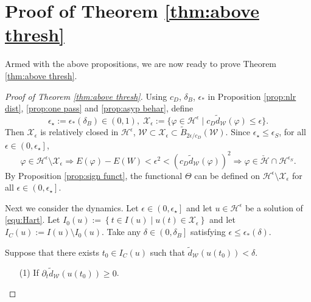 \documentclass[reqno, 11pt]{amsart}
\numberwithin{equation}{section}
\theoremstyle{plain}
\theoremstyle{definition}
\numberwithin{equation}{section}
\numberwithin{theorem}{section}
\numberwithin{equation}{section}
\numberwithin{equation}{section}
\numberwithin{theorem}{section}
\begin{document}
	\section{Proof of Theorem \ref{thm:above thresh}}\label{sect:pf main thm}
	Armed with the above propositions, we are now ready to prove Theorem \ref{thm:above thresh}.
	\begin{proof}[Proof of Theorem \ref{thm:above thresh}]
		Using $c_D$, $\delta_{B}$, $\epsilon_{*}$ in Proposition \ref{prop:nlr dist}, \ref{prop:one pass} and \ref{prop:asyp behar}, define 
		\begin{equation*}
		\epsilon_\star:=\epsilon_{*}(\delta_{B})\in(0,1),\; \mathcal{X}_{\epsilon}:=\{\varphi\in \mathcal{H}^{\epsilon}\;|\;c_D\widetilde{d}_{\mathcal{W}}(\varphi)\leq\epsilon  \}.
		\end{equation*}
		Then $\mathcal{X}_{\epsilon}$ is relatively closed in $\mathcal{H}^{\epsilon}$, $\mathcal{W} \subset \mathcal{X}_\epsilon \subset \widetilde{B}_{2\epsilon/ c_D}(\mathcal{W})$. Since $\epsilon_\star \leq \epsilon_{S}$, for all $\epsilon\in \left(0,\epsilon_\star  \right]$,
		\begin{equation*}
		\varphi\in \mathcal{H}^{\epsilon}\setminus \mathcal{X}_{\epsilon} \Longrightarrow E(\varphi)-E(W)<\epsilon^2<\left(c_D \widetilde{d}_{\mathcal{W}}(\varphi) \right)^2\Longrightarrow\varphi \in \check{\mathcal{H}}\cap \mathcal{H}^{\epsilon_{S}}.
		\end{equation*}		
		By Proposition \ref{prop:sign funct}, the functional $\Theta$ can be defined on $\mathcal{H}^{\epsilon}\setminus \mathcal{X}_{\epsilon}$ for all $\epsilon\in \left(0,\epsilon_\star  \right]$.
		
		Next we consider the dynamics. Let $\epsilon\in \left(0,\epsilon_\star  \right]$ and let $u\in \mathcal{H}^{\epsilon}$ be a solution of \eqref{equ:Hart}. Let $I_0(u):=\left\{t\in I(u)\; |\;  u(t)\in\mathcal{X}_\epsilon \right\}$ and let $I_C(u):=I(u)\setminus I_0(u)$. Take any $\delta\in \left(0,\delta_{B} \right]$ satisfying $\epsilon \leq \epsilon_{*}(\delta)$.
		
		 Suppose that there exists $t_0\in I_C(u)$ such that $\widetilde{d}_{\mathcal{W}}\left(u(t_0)\right)<\delta$.
		\begin{enumerate}
			\item[(1)] If $\partial_{t}\widetilde{d}_{\mathcal{W}}\left(u(t_0)\right)\geq 0$.
			

\end{enumerate}
\end{proof}
\end{document}

